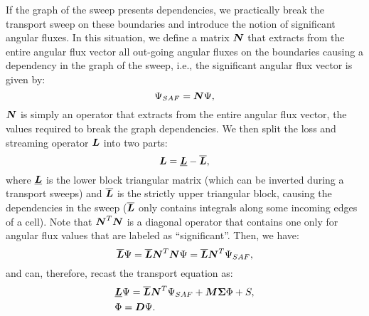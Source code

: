 If the graph of the sweep presents dependencies, we practically break the
transport sweep on these boundaries and introduce the notion of significant
angular fluxes. In this situation, we define a matrix $\boldsymbol{N}$ that extracts
from the entire angular flux vector all out-going angular fluxes on the
boundaries causing a dependency in the graph of the sweep, i.e., the
significant angular flux vector is given by:
\begin{equation}
  \Psi_{SAF} = \boldsymbol{N} \Psi,
\end{equation}
$\boldsymbol{N}$ is simply an operator that extracts from the entire angular flux vector,
the values required to break the graph dependencies. We then split the loss
and streaming operator $\boldsymbol{L}$ into two parts:
\begin{equation}
  \boldsymbol{L} = \underline{\boldsymbol{L}} - \overline{\boldsymbol{L}},
\end{equation}
where $\underline{\boldsymbol{L}}$ is the lower block triangular matrix (which can be
inverted during a transport sweeps) and $\overline{\boldsymbol{L}}$ is the strictly
upper triangular block, causing the dependencies in the sweep
($\overline{\boldsymbol{L}}$ only contains integrals along some incoming edges of a
cell). Note that $\boldsymbol{N}^T\boldsymbol{N}$ is a diagonal operator that contains one only
for angular flux values that are labeled as ``significant''. Then, we have:
\begin{equation}
  \overline{\boldsymbol{L}} \Psi = \overline{\boldsymbol{L}} \boldsymbol{N}^T\boldsymbol{N}\Psi =
  \overline{\boldsymbol{L}}\boldsymbol{N}^T \Psi_{SAF},
\end{equation}
and can, therefore, recast the transport equation as:
\begin{align}
  &\underline{\boldsymbol{L}}\Psi =\overline{\boldsymbol{L}}\boldsymbol{N}^T \Psi_{SAF} + \boldsymbol{M\Sigma}
  \Phi + S,\\
  &\Phi = \boldsymbol{D}\Psi.
\end{align}
